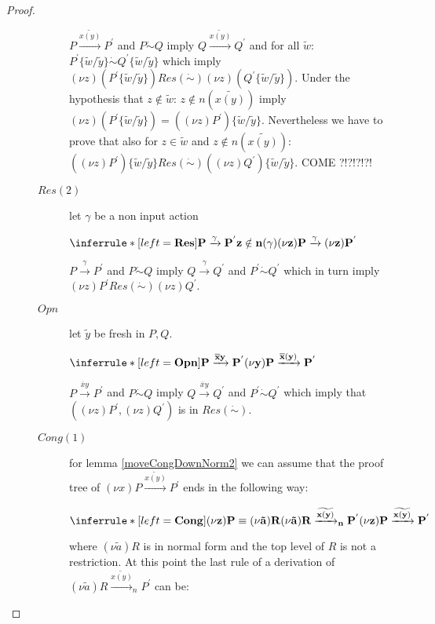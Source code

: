\begin{proposition}
\begin{proof}
\begin{description}
\begin{description}
	    $P \xrightarrow{\widetilde{x(y)}} P^{'}$ and $P\dot{\sim}Q$ imply $Q \xrightarrow{\widetilde{x(y)}} Q^{'}$ and for all $\tilde{w}$: $P^{'}\{\tilde{w}/\tilde{y}\} \dot{\sim} Q^{'}\{\tilde{w}/\tilde{y}\}$ which imply $(\nu z)(P^{'}\{\tilde{w}/\tilde{y}\}) Res(\dot{\sim}) (\nu z)(Q^{'}\{\tilde{w}/\tilde{y}\})$. Under the hypothesis that $z\notin \tilde{w}$: $z \notin n(\widetilde{x(y)})$ imply $(\nu z)(P^{'}\{\tilde{w}/\tilde{y}\})=((\nu z) P^{'})\{\tilde{w}/\tilde{y}\}$. Nevertheless we have to prove that also for $z\in \tilde{w}$ and $z \notin n(\widetilde{x(y)})$: $((\nu z)P^{'})\{\tilde{w}/\tilde{y}\} Res(\dot{\sim}) ((\nu z)Q^{'})\{\tilde{w}/\tilde{y}\}$.
	    COME ?!?!?!?!
	  \item[$Res(2)$]
	    let $\gamma$ be a non input action 
	    \begin{center}
	      $\inferrule* [left=\bf{Res}]{
		  P \xrightarrow{\gamma} P^{'}
		\\
		  z \notin n(\gamma)
	      }{
		(\nu z)P \xrightarrow{\gamma} (\nu z)P^{'}
	      }$
	    \end{center}
	    $P \xrightarrow{\gamma} P^{'}$ and $P\dot{\sim}Q$ imply $Q \xrightarrow{\gamma} Q^{'}$ and $P^{'} \dot{\sim} Q^{'}$ which in turn imply $(\nu z)P^{'} Res(\dot{\sim}) (\nu z)Q^{'}$.
	  \item[$Opn$]
	    let $\tilde{y}$ be fresh in $P,Q$.
	    \begin{center}
	      $\inferrule* [left=\bf{Opn}]{
		  P \xrightarrow{\overline{x}y} P^{'}
	      }{
		(\nu y)P \xrightarrow{\overline{x}(y)} P^{'}
	      }$
	    \end{center}
	    $P \xrightarrow{\overline{x}y} P^{'}$ and $P\dot{\sim}Q$ imply $Q \xrightarrow{\overline{x}y} Q^{'}$ and $P^{'} \dot{\sim} Q^{'}$ which imply that $((\nu z)P^{'}, (\nu z)Q^{'})$ is in $Res(\dot{\sim})$.
	  \item[$Cong(1)$]
	    for lemma \ref{moveCongDownNorm2} we can assume that the proof tree of $(\nu x)P \xrightarrow{\widetilde{x(y)}} P^{'}$ ends in the following way:
	    \begin{center}
	      $\inferrule* [left=\bf{Cong}]{
		  (\nu z)P \equiv (\nu \tilde{a})R
		\\
		  (\nu \tilde{a})R \xrightarrow{\widetilde{x(y)}}_{n} P^{'}
	      }{
		(\nu z)P \xrightarrow{\widetilde{x(y)}} P^{'}
	      }$
	    \end{center}
	    where $(\nu \tilde{a})R$ is in normal form and the top level of $R$ is not a restriction. At this point the last rule of a derivation of $(\nu \tilde{a})R \xrightarrow{\widetilde{x(y)}}_{n} P^{'}$ can be: 

\end{description}
\end{description}
\end{proof}
\end{proposition}
